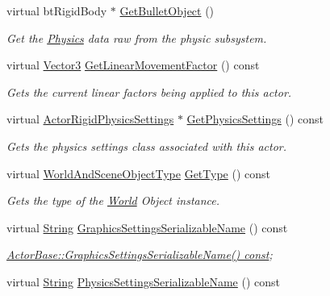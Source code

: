 \begin{DoxyCompactItemize}
virtual bt\-Rigid\-Body $\ast$ \hyperlink{classMezzanine_1_1ActorRigid_aec84029880e2cebf3cc154ada813a372}{Get\-Bullet\-Object} ()
\begin{DoxyCompactList}\small\item\em Get the \hyperlink{namespaceMezzanine_1_1Physics}{Physics} data raw from the physic subsystem. \end{DoxyCompactList}\item 
virtual \hyperlink{classMezzanine_1_1Vector3}{Vector3} \hyperlink{classMezzanine_1_1ActorRigid_ac2577cc9bff31ad343d5e179acc95257}{Get\-Linear\-Movement\-Factor} () const 
\begin{DoxyCompactList}\small\item\em Gets the current linear factors being applied to this actor. \end{DoxyCompactList}\item 
virtual \hyperlink{classMezzanine_1_1ActorRigidPhysicsSettings}{Actor\-Rigid\-Physics\-Settings} $\ast$ \hyperlink{classMezzanine_1_1ActorRigid_a6ed901638c88e4b9e09605152e11d56e}{Get\-Physics\-Settings} () const 
\begin{DoxyCompactList}\small\item\em Gets the physics settings class associated with this actor. \end{DoxyCompactList}\item 
virtual \hyperlink{namespaceMezzanine_ae8cd04f706f4998be62f454b7119c718}{World\-And\-Scene\-Object\-Type} \hyperlink{classMezzanine_1_1ActorRigid_afc18444d5f13990a3458455c217f58cd}{Get\-Type} () const 
\begin{DoxyCompactList}\small\item\em Gets the type of the \hyperlink{classMezzanine_1_1World}{World} Object instance.  \end{DoxyCompactList}\item 
\hypertarget{classMezzanine_1_1ActorRigid_a935069f346c516e07f3aa7a89388dea0}{virtual \hyperlink{namespaceMezzanine_acf9fcc130e6ebf08e3d8491aebcf1c86}{String} \hyperlink{classMezzanine_1_1ActorRigid_a935069f346c516e07f3aa7a89388dea0}{Graphics\-Settings\-Serializable\-Name} () const }\label{classMezzanine_1_1ActorRigid_a935069f346c516e07f3aa7a89388dea0}

\begin{DoxyCompactList}\small\item\em \hyperlink{classMezzanine_1_1ActorBase_a636a0dbf78907d565d4cabd994442637}{Actor\-Base\-::\-Graphics\-Settings\-Serializable\-Name() const}; \end{DoxyCompactList}\item 
\hypertarget{classMezzanine_1_1ActorRigid_ac91177e6d50052f97997a4dfef975a59}{virtual \hyperlink{namespaceMezzanine_acf9fcc130e6ebf08e3d8491aebcf1c86}{String} \hyperlink{classMezzanine_1_1ActorRigid_ac91177e6d50052f97997a4dfef975a59}{Physics\-Settings\-Serializable\-Name} () const }\label{classMezzanine_1_1ActorRigid_ac91177e6d50052f97997a4dfef975a59}


\end{DoxyCompactItemize}
